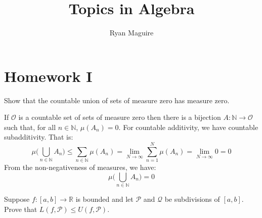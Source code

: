 \documentclass[crop=false,class=article]{standalone}                       %
\begin{document}
    \title{Topics in Algebra}
    \author{Ryan Maguire}
    \date{\vspace{-5ex}}
    \maketitle
    \tableofcontents
    \section{Homework I}
    \begin{problem}
        Show that the countable union of sets of measure zero has
        measure zero.
    \end{problem}
    \begin{solution}
        If $\mathcal{O}$ is a countable set of sets of measure zero then
        there is a bijection $A:\mathbb{N}\rightarrow\mathcal{O}$ such
        that, for all $n\in\mathbb{N}$, $\mu(A_{n})=0$. For countable
        additivity, we have countable subadditivity. That is:
        \begin{equation}
            \mu\Big(\bigcup_{n\in\mathbb{N}}A_{n}\Big)
            \leq\sum_{n\in\mathbb{N}}\mu(A_{n})
            =\underset{N\rightarrow\infty}{\lim}
                \sum_{n=1}^{N}\mu(A_{n})
            =\underset{N\rightarrow\infty}{\lim}0
            =0
        \end{equation}
        From the non-negativeness of measures, we have:
        \begin{equation}
            \mu\Big(\bigcup_{n\in\mathbb{N}}A_{n}\Big)=0
        \end{equation}
    \end{solution}
    \begin{problem}
        Suppose $f:[a,b]\rightarrow\mathbb{R}$ is bounded and let
        $\mathcal{P}$ and $\mathcal{Q}$ be subdivisions of $[a,b]$. Prove
        that $L(f,\mathcal{P})\leq{U}(f,\mathcal{P})$.
    \end{problem}
\end{document}
